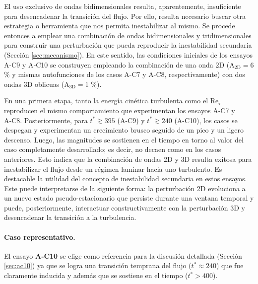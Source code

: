 El uso exclusivo de ondas bidimensionales resulta, aparentemente, insuficiente para desencadenar la transición del flujo. Por ello, resulta necesario buscar otra estrategia o herramienta que nos permita inestabilizar al mismo. Se procede entonces a emplear una combinación de ondas bidimensionales y tridimensionales para construir una perturbación que pueda reproducir la inestabilidad secundaria (Sección \ref{sec:mecanismo}). En este sentido, las condiciones iniciales de los ensayos A‑C9 y A‑C10 se construyen empleando la combinación de una onda 2D (A$_\text{2D}=6$ \% y mismas autofunciones de los casos A-C7 y A-C8, respectivamente) con dos ondas 3D oblicuas (A$_\text{3D}=1$ \%). 

En una primera etapa, tanto la energía cinética turbulenta como el Re$_{\tau}$ reproducen el mismo comportamiento que experimentan los ensayos A‑C7 y A‑C8. Posteriormente, para $t^* \gtrsim 395$ (A-C9) y $t^* \gtrsim 240$ (A-C10), los casos se despegan y experimentan un crecimiento \linebreak brusco seguido de un pico y un ligero descenso. Luego, las magnitudes se sostienen en el tiempo en torno al valor del caso completamente desarrollado; es decir, no decaen como en los casos anteriores. Esto indica que la combinación de ondas 2D y 3D resulta exitosa para inestabilizar el flujo desde un régimen laminar hacia uno turbulento. Es destacable la utilidad del concepto de inestabilidad secundaria en estos ensayos. Este puede interpretarse de la siguiente forma: la perturbación 2D evoluciona a un nuevo estado pseudo-estacionario que persiste durante una ventana temporal y puede, posteriormente, interactuar constructivamente con la perturbación 3D y desencadenar la transición a la turbulencia.


\paragraph{Caso representativo.} El ensayo \textbf{A‑C10} se elige como referencia para la discusión detallada (Sección \ref{sec:ac10}) ya que se logra una transición temprana del flujo ($t^* \approx 240$) que fue claramente inducida y además que se sostiene en el tiempo ($t^*>400$). 

